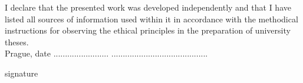 I declare that the presented work was developed independently and that I have listed all sources of information used within it in accordance with the methodical instructions for observing the ethical principles in the preparation of university theses.\\

\noindent Prague, date ........................ \hfill ..........................................
\noindent \begin{flushright}
signature
\end{flushright}
